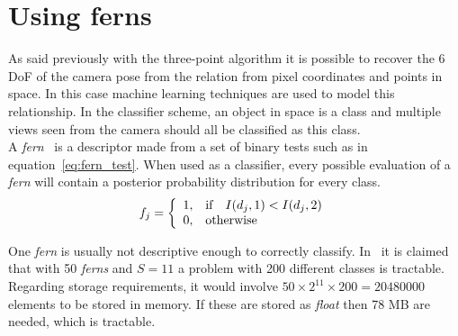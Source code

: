 \section{Using ferns}
\label{sec:using_ferns}

As said previously with the three-point algorithm it is possible to recover the 6 DoF of the camera pose from the relation from pixel coordinates and points in space. In this case machine learning techniques are used to model this relationship. In the classifier scheme, an object in space is a class and multiple views seen from the camera should all be classified as this class.\\

A \textit{fern}~\cite{Ozuysal2010} is a descriptor made from a set of binary tests such as in equation~\ref{eq:fern_test}. When used as a classifier, every possible evaluation of a \textit{fern} will contain a posterior probability distribution for every class.\\

\begin{equation}
  f_j =
  \left\{
    \begin{array}{l l}
      1, & \text{if} \quad I(d_j,1) < I(d_j,2) \\
      0, & \text{otherwise}
    \end{array} \right.
  \label{eq:fern_test}
\end{equation}


One \textit{fern} is usually not descriptive enough to correctly classify. In~\cite{Ozuysal2010} it is claimed that with 50 \textit{ferns} and $S=11$ a problem with 200 different classes is tractable. Regarding storage requirements, it would involve $50\times2^{11}\times200 = 20480000$ elements to be stored in memory. If these are stored as \textit{float} then 78 MB are needed, which is tractable. \\
